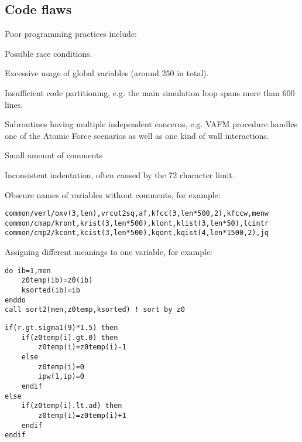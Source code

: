 \subsection{Code flaws} \label{ref:flaws}
Poor programming practices include:
\begin{itemize}
    \item Possible race conditions.
    \item Excessive usage of global variables (around 250 in total).
    \item Insufficient code partitioning, e.g. the main simulation loop spans more than 600 lines. 
    \item Subroutines having multiple independent concerns, e.g. VAFM procedure handles one of the Atomic Force scenarios as well as one kind of wall interactions.
    \item Small amount of comments
    \item Inconsistent indentation, often caused by the 72 character limit.
    
    \item Obscure names of variables without comments, for example:
    \begin{lstlisting}[firstnumber=32, title=Names of some global variables in code]
common/verl/oxv(3,len),vrcut2sq,af,kfcc(3,len*500,2),kfccw,menw
common/cmap/kront,krist(3,len*500),klont,klist(3,len*50),lcintr
common/cmp2/kcont,kcist(3,len*500),kqont,kqist(4,len*1500,2),jq
    \end{lstlisting}
    
    \begin{minipage}{\textwidth}
    \item Assigning different meanings to one variable, for example:
    
    \begin{lstlisting}[firstnumber=3977, title=\texttt{z0temp} used as an array of z-axis positions]
do ib=1,men
    z0temp(ib)=z0(ib)
    ksorted(ib)=ib
enddo
call sort2(men,z0temp,ksorted) ! sort by z0
    \end{lstlisting}
    
    \begin{lstlisting}[firstnumber=6835, title=\texttt{z0temp} used as an array of adiabatic counters]
if(r.gt.sigma1(9)*1.5) then
    if(z0temp(i).gt.0) then
        z0temp(i)=z0temp(i)-1
    else
        z0temp(i)=0
        ipw(1,ip)=0
    endif
else
    if(z0temp(i).lt.ad) then
        z0temp(i)=z0temp(i)+1
    endif
endif
    \end{lstlisting}
    \end{minipage}
    

\end{itemize}
